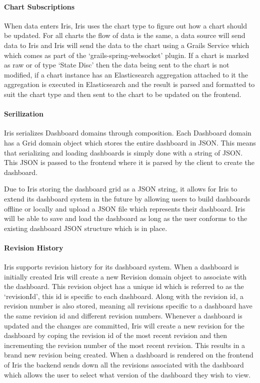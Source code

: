 \documentclass[12pt,a4paper,titlepage]{report}
\begin{document}
\paragraph{Chart Subscriptions}
When data enters Iris, Iris uses the chart type to figure out how a chart should be updated. For all charts the flow of data is the same, a data source will send data to Iris and Iris will send the data to the chart using a Grails Service which which comes as part of the `grails-spring-websocket' plugin. If a chart is marked as raw or of type `State Disc' then the data being sent to the chart is not modified, if a chart instance has an Elasticsearch aggregation attached to it the aggregation is executed in Elasticsearch and the result is parsed and formatted to suit the chart type and then sent to the chart to be updated on the frontend.

\paragraph{Serilization}
Iris serializes Dashboard domains through composition. Each Dashboard domain has a Grid domain object which stores the entire dashboard in JSON. This means that serializing and loading dashboards is simply done with a string of JSON. This JSON is passed to the frontend where it is parsed by the client to create the dashboard.

Due to Iris storing the dashboard grid as a JSON string, it allows for Iris to extend its dashboard system in the future by allowing users to build dashboards offline or locally and upload a JSON file which represents their dashboard. Iris will be able to save and load the dashboard as long as the user conforms to the existing dashboard JSON structure which is in place.

\paragraph{Revision History}
Iris supports revision history for its dashboard system. When a dashboard is initially created Iris will create a new Revision domain object to associate with the dashboard. This revision object has a unique id which is referred to as the `revisionId', this id is specific to each dashboard. Along with the revision id, a revision number is also stored, meaning all revisions specific to a dashboard have the same revision id and different revision numbers. Whenever a dashboard is updated and the changes are committed, Iris will create a new revision for the dashboard by coping the revision id of the most recent revision and then incrementing the revision number of the most recent revision. This results in a brand new revision being created. When a dashboard is rendered on the frontend of Iris the backend sends down all the revisions associated with the dashboard which allows the user to select what version of the dashboard they wish to view.
\end{document}
